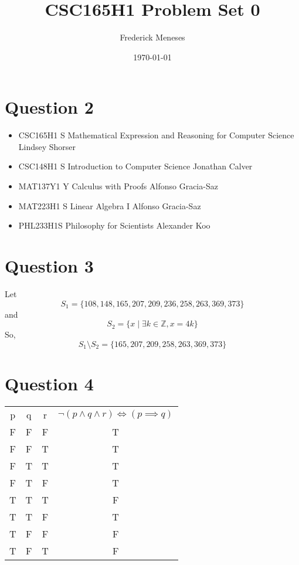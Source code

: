 \documentclass[12pt, a4paper]{article}
\title{CSC165H1 Problem Set 0}
\author{Frederick Meneses }
\date{\today}
\begin{document}
\maketitle
\section*{Question 2}
\begin{itemize}
    \item CSC165H1 S Mathematical Expression and Reasoning for Computer Science Lindsey Shorser
    \item CSC148H1 S Introduction to Computer Science Jonathan Calver
    \item MAT137Y1 Y Calculus with Proofs Alfonso Gracia-Saz
    \item MAT223H1 S Linear Algebra I Alfonso Gracia-Saz
    \item PHL233H1S Philosophy for Scientists Alexander Koo
    
\end{itemize}

\section*{Question 3}
Let
    \[S_1 = \{108, 148, 165, 207, 209, 236, 258, 263, 369, 373\}\] 
and \[S_2 = \{x \mid \exists{k} \in \mathbb{Z},  x=4k\}\]
So,
    \[S_1 \setminus S_2 = \{165, 207, 209, 258, 263, 369, 373\}\]

\section*{Question 4}
\begin{tabular}{|c|c|c|c|}
     p & q & r & $\lnot(p \land q \land r) \iff (p \implies q)$ \\
     F & F & F & T \\
     F & F & T & T \\
     F & T & T & T \\
     F & T & F & T \\
     T & T & T & F \\
     T & T & F & T \\
     T & F & F & F \\
     T & F & T & F \\
\end{tabular}
\end{document}
